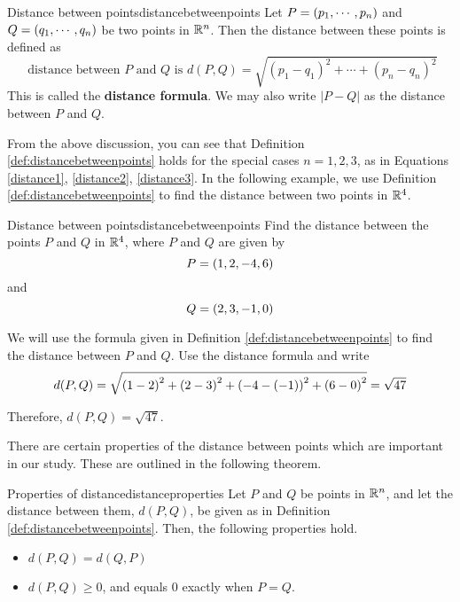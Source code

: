 \begin{definition}{Distance between points}{distancebetweenpoints}
Let $P=\left(p_{1},\cdots ,p_{n}\right) $ and 
$Q=\left(q_{1},\cdots ,q_{n}\right) $ be two points in 
$\mathbb{R}^{n}$. Then the distance
between these points is defined as
\begin{equation*}
\text{ distance between }P\text{ and } Q\text{ is } 
d( P, Q ) =\sqrt{ (p_1-q_1)^2 + \cdots + (p_n-q_n)^2}
\end{equation*}
This is called the \textbf{distance formula}. We may also write $\left\vert P - Q \right\vert $ as the distance between $P$ and $Q$.
\end{definition}

From the above discussion, you can see that Definition \ref{def:distancebetweenpoints} holds for the special cases $n=1,2,3$, as in 
Equations \ref{distance1}, \ref{distance2}, \ref{distance3}. 
In the following example, we use Definition \ref{def:distancebetweenpoints} to find the distance between two points in
$\mathbb{R}^4$.

\begin{example}{Distance between points}{distancebetweenpoints}
Find the distance between the points $P$ and $Q$ in $\mathbb{R}^{4}$,
where $P$ and $Q$ are given by 
\begin{equation*}
P=\left(1,2,-4,6\right)
\end{equation*}
and
\begin{equation*}
Q=\left(2,3,-1,0\right)
\end{equation*}
\end{example}

\begin{solution}
We will use the formula given in Definition \ref{def:distancebetweenpoints} to find the distance between
$P$ and $Q$. 
Use the distance formula and write
\begin{equation*}
d(P,Q)= \sqrt{ \left(1-2\right) ^{2}+\left(2-3\right)
^{2}+\left(-4-\left(-1\right) \right) ^{2}+\left(6-0\right)^{2}} = \sqrt{47}
\end{equation*}

Therefore, $d( P,Q) =
\sqrt{47}.$

\end{solution}

There are certain properties of the distance between points which are important in our study.
These are outlined in the following theorem.

\begin{theorem}{Properties of distance}{distanceproperties}
Let $P$ and $Q$ be points in $\mathbb{R}^n$, and let the distance between them,
$d( P, Q)$, be given as in Definition \ref{def:distancebetweenpoints}. 
Then, the following properties hold.
\begin{itemize}
\item $ d( P, Q) = d( Q, P)  $
\item $ d( P, Q) \geq 0$, and equals 0 exactly when $P = Q.$
\end{itemize}
\end{theorem}

